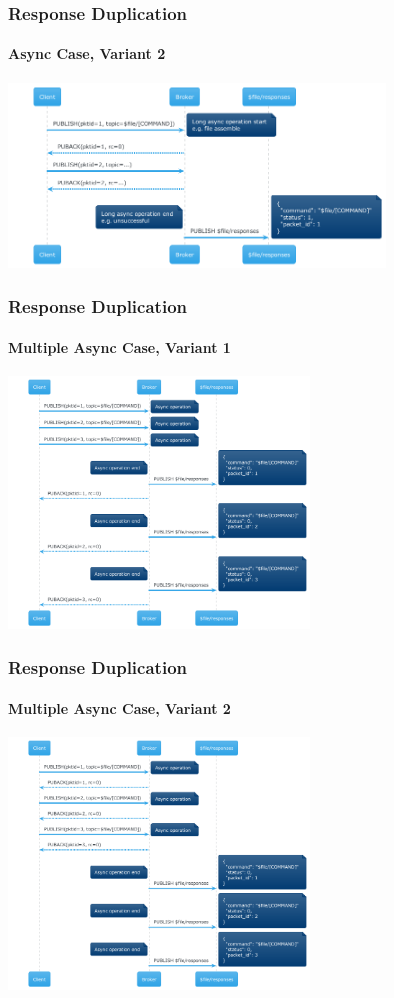 \documentclass{beamer}
\begin{document}
\begin{frame}
    \frametitle{Response Duplication}
    \framesubtitle{Async Case, Variant 2}

    \begin{center}
        \includegraphics[width=10cm, keepaspectratio]{images/flow-topic-dup-async-2.png}
    \end{center}
\end{frame}

\begin{frame}
    \frametitle{Response Duplication}
    \framesubtitle{Multiple Async Case, Variant 1}

    \begin{center}
        \includegraphics[width=8cm, keepaspectratio]{images/flow-topic-dup-async-multi-1.png}
    \end{center}
\end{frame}

\begin{frame}
    \frametitle{Response Duplication}
    \framesubtitle{Multiple Async Case, Variant 2}

    \begin{center}
        \includegraphics[width=8cm, keepaspectratio]{images/flow-topic-dup-async-multi-2.png}
    \end{center}
\end{frame}
\end{document}
